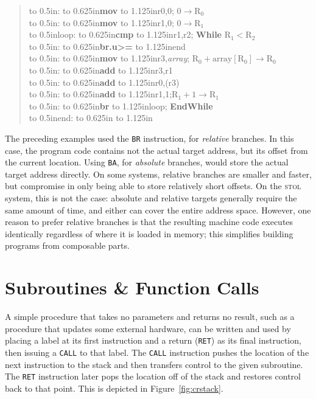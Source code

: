 \documentclass[12pt,english]{book}
\newcommand*{\asmstyle}{\noindent\ttfamily\selectfont\small}
\newcommand*{\asmline}[3][]{%
\null\hbox to 0.5in{\ifx#1\empty\else{#1}:\fi\hss}%
\hbox to 0.625in{\textbf{#2}\hss}%
\hbox to 1.125in{#3\hss}}
\begin{document}
\begin{quote}\asmstyle
  \asmline{mov}{r0,0}; \(0\rightarrow\text{R}_0\)\\
  \asmline{mov}{r1,0}; \(0\rightarrow\text{R}_1\)\\
  \asmline[loop]{cmp}{r1,r2};
  \textbf{While} \(\text{R}_1 < \text{R}_2\)\\
  \asmline{br.u>=}{end}\\
  \asmline{mov}{r3,\textit{array}};\qquad%
  \(\text{R}_0 + \text{array}[\text{R}_0]\rightarrow\text{R}_0\)\\
  \asmline{add}{r3,r1}\\
  \asmline{add}{r0,(r3)}\\
  \asmline{add}{r1,1};\qquad\(\text{R}_1+1\rightarrow\text{R}_1\)\\
  \asmline{br}{loop}; \textbf{EndWhile}\\
  \asmline[end]{}{}
\end{quote}

The preceding examples used the \texttt{BR} instruction,
for \emph{relative} branches.
In this case, the program code contains not the actual target address,
but its offset from the current location.
Using \texttt{BA}, for \emph{absolute} branches,
would store the actual target address directly.
On some systems, relative branches are smaller and faster,
but compromise in only being able to store relatively short offsets.
On the \textsc{stol} system, this is not the case:
absolute and relative targets
generally require the same amount of time,
and either can cover the entire address space.
However, one reason to prefer relative branches
is that the resulting machine code executes identically
regardless of where it is loaded in memory;
this simplifies building programs from composable parts.

\section{Subroutines \& Function Calls}\label{sec:calling}
A simple procedure that takes no parameters and returns no result,
such as a procedure that updates some external hardware,
can be written and used by placing a label at its first instruction
and a return (\texttt{RET}) as its final instruction,
then issuing a \texttt{CALL} to that label.
The \texttt{CALL} instruction pushes
the location of the next instruction to the stack
and then transfers control to the given subroutine.
The \texttt{RET} instruction later pops the location off of the stack
and restores control back to that point.
This is depicted in Figure~\ref{fig:crstack}.
\end{document}

